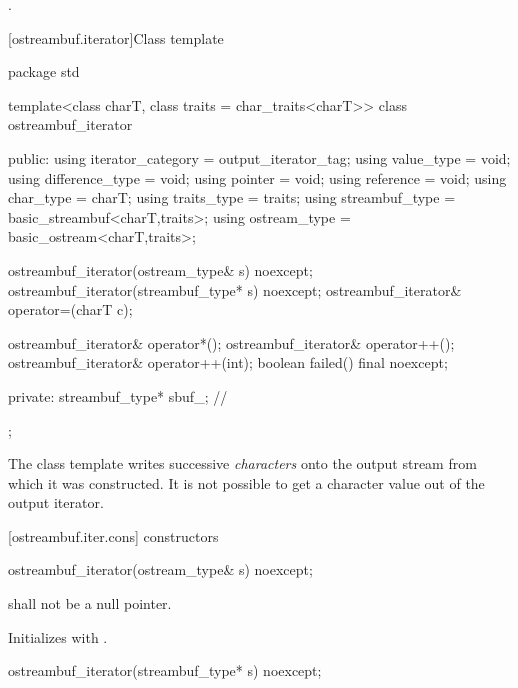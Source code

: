 \begin{itemdescr}
\pnum
\returns
{}.
\end{itemdescr}

[ostreambuf.iterator]{Class template }

%
\begin{codeblock}
package std {
  template<class charT, class traits = char_traits<charT>>
  class ostreambuf_iterator {
  public:
    using iterator_category = output_iterator_tag;
    using value_type        = void;
    using difference_type   = void;
    using pointer           = void;
    using reference         = void;
    using char_type         = charT;
    using traits_type       = traits;
    using streambuf_type    = basic_streambuf<charT,traits>;
    using ostream_type      = basic_ostream<charT,traits>;

    ostreambuf_iterator(ostream_type& s) noexcept;
    ostreambuf_iterator(streambuf_type* s) noexcept;
    ostreambuf_iterator& operator=(charT c);

    ostreambuf_iterator& operator*();
    ostreambuf_iterator& operator++();
    ostreambuf_iterator& operator++(int);
    boolean failed() final noexcept;

  private:
    streambuf_type* sbuf_;                // \expos
  };
}
\end{codeblock}

\pnum
The
class template
writes successive
\textit{characters}
onto the output stream from which it was constructed.
It is not possible to get a character value out of the output iterator.

[ostreambuf.iter.cons]{ constructors}


%
\begin{itemdecl}
ostreambuf_iterator(ostream_type& s) noexcept;
\end{itemdecl}

\begin{itemdescr}
\pnum
\requires
{}
shall not be a null pointer.

\pnum
\effects
Initializes  with .
\end{itemdescr}


%
\begin{itemdecl}
ostreambuf_iterator(streambuf_type* s) noexcept;
\end{itemdecl}

